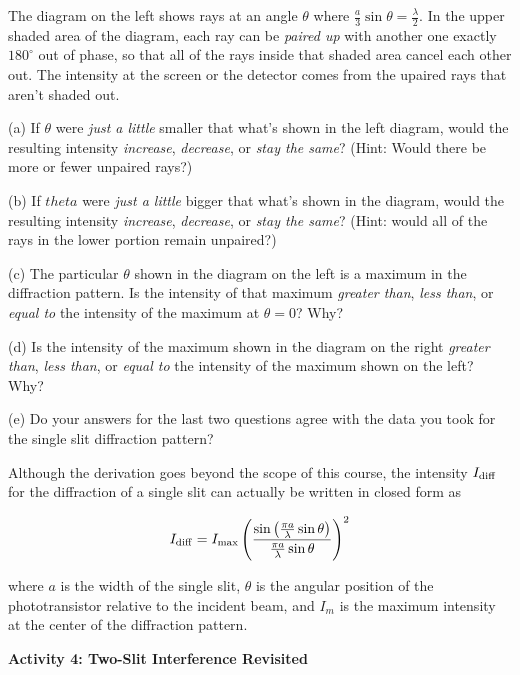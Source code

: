 The diagram on the left shows rays at an angle $\theta$ where $\frac{a}{3} \sin \theta = \frac{\lambda}{2}$.  In the upper shaded area of the diagram, each ray can be \textit{paired up} with another one exactly $180^{\circ}$ out of phase, so that all of the rays inside that shaded area cancel each other out.  The intensity at the screen or the detector  comes from the upaired rays that aren't shaded out.

(a) If $\theta$ were \textit{just a little} smaller that what's shown in the left diagram, would the resulting intensity \textit{increase}, \textit{decrease}, or \textit{stay the same}? (Hint: Would there be more or fewer unpaired rays?)
\answerspace{0.4in}

(b) If $theta$ were \textit{just a little} bigger that what's shown in the diagram, would the resulting intensity \textit{increase}, \textit{decrease}, or \textit{stay the same}?  (Hint: would all of the rays in the lower portion remain unpaired?)
\answerspace{0.4in}

(c) The particular $\theta$ shown in the diagram on the left is a maximum in the diffraction pattern.  Is the intensity of that maximum \textit{greater than}, \textit{less than}, or \textit{equal to} the intensity of the maximum at $\theta = 0$?  Why?
\answerspace{0.4in}

(d) Is the intensity of the maximum shown in the diagram on the right \textit{greater than}, \textit{less than}, or \textit{equal to} the intensity of the maximum shown on the left?  Why?  
\answerspace{0.4in}

(e) Do your answers for the last two questions agree with the data you took for the single slit diffraction pattern?
\answerspace{0.2in}


\pagebreak[2]
Although the derivation goes beyond the scope of this course, the intensity $I_{\rm{diff}}$ for the diffraction of a single slit can actually be written in closed form as

\begin{displaymath} 
I_{\rm{diff}} = I_{\rm{max}} \left( \frac {\sin \left(\frac {\pi a} {\lambda} \sin \theta \right)} {\frac {\pi a} {\lambda} \sin \theta} \right)^2 \end{displaymath}

where $a$ is the width of the single slit, \( \theta  \) is the angular
position of the phototransistor relative to the incident beam, and $I_{m}$
is the maximum intensity at the center of the diffraction pattern.

\pagebreak[2]
\textbf{Activity 4: Two-Slit Interference Revisited}

